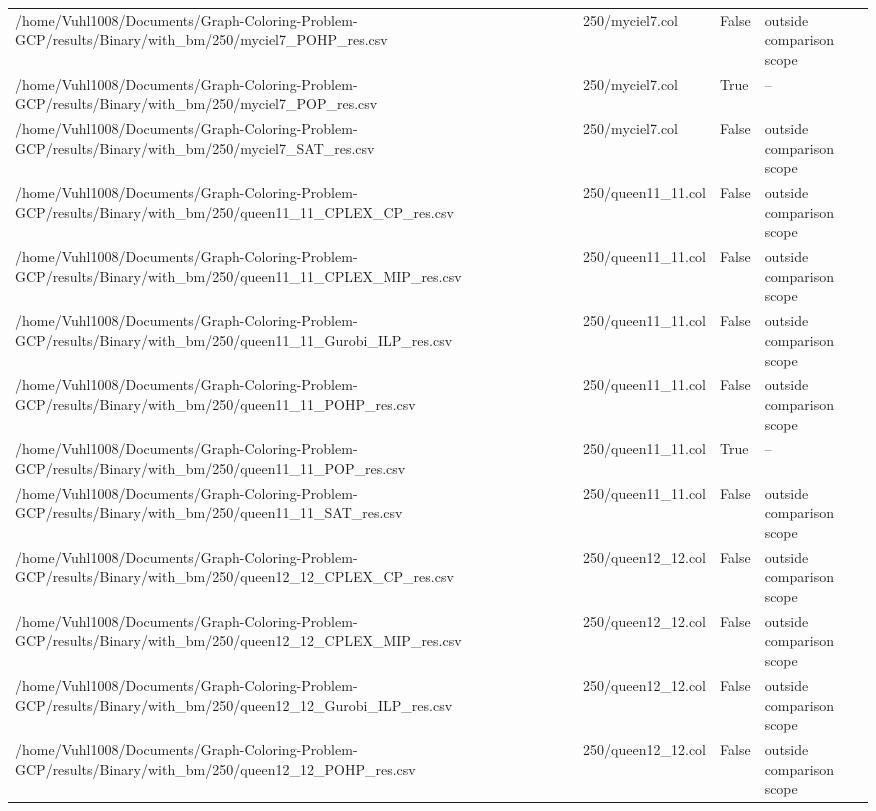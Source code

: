 \begin{table}[htbp]
\begin{tabular}{llll}
/home/Vuhl1008/Documents/Graph-Coloring-Problem-GCP/results/Binary/with\_bm/250/myciel7\_POHP\_res.csv & 250/myciel7.col & False & outside comparison scope \\
/home/Vuhl1008/Documents/Graph-Coloring-Problem-GCP/results/Binary/with\_bm/250/myciel7\_POP\_res.csv & 250/myciel7.col & True & -- \\
/home/Vuhl1008/Documents/Graph-Coloring-Problem-GCP/results/Binary/with\_bm/250/myciel7\_SAT\_res.csv & 250/myciel7.col & False & outside comparison scope \\
/home/Vuhl1008/Documents/Graph-Coloring-Problem-GCP/results/Binary/with\_bm/250/queen11\_11\_CPLEX\_CP\_res.csv & 250/queen11\_11.col & False & outside comparison scope \\
/home/Vuhl1008/Documents/Graph-Coloring-Problem-GCP/results/Binary/with\_bm/250/queen11\_11\_CPLEX\_MIP\_res.csv & 250/queen11\_11.col & False & outside comparison scope \\
/home/Vuhl1008/Documents/Graph-Coloring-Problem-GCP/results/Binary/with\_bm/250/queen11\_11\_Gurobi\_ILP\_res.csv & 250/queen11\_11.col & False & outside comparison scope \\
/home/Vuhl1008/Documents/Graph-Coloring-Problem-GCP/results/Binary/with\_bm/250/queen11\_11\_POHP\_res.csv & 250/queen11\_11.col & False & outside comparison scope \\
/home/Vuhl1008/Documents/Graph-Coloring-Problem-GCP/results/Binary/with\_bm/250/queen11\_11\_POP\_res.csv & 250/queen11\_11.col & True & -- \\
/home/Vuhl1008/Documents/Graph-Coloring-Problem-GCP/results/Binary/with\_bm/250/queen11\_11\_SAT\_res.csv & 250/queen11\_11.col & False & outside comparison scope \\
/home/Vuhl1008/Documents/Graph-Coloring-Problem-GCP/results/Binary/with\_bm/250/queen12\_12\_CPLEX\_CP\_res.csv & 250/queen12\_12.col & False & outside comparison scope \\
/home/Vuhl1008/Documents/Graph-Coloring-Problem-GCP/results/Binary/with\_bm/250/queen12\_12\_CPLEX\_MIP\_res.csv & 250/queen12\_12.col & False & outside comparison scope \\
/home/Vuhl1008/Documents/Graph-Coloring-Problem-GCP/results/Binary/with\_bm/250/queen12\_12\_Gurobi\_ILP\_res.csv & 250/queen12\_12.col & False & outside comparison scope \\
/home/Vuhl1008/Documents/Graph-Coloring-Problem-GCP/results/Binary/with\_bm/250/queen12\_12\_POHP\_res.csv & 250/queen12\_12.col & False & outside comparison scope \\

\end{tabular}
\end{table}

